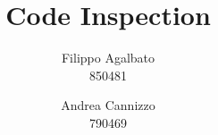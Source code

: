\documentclass[a4paper]{report}
\begin{document}
\setcounter{tocdepth}{1}

\title{\Huge Code Inspection}
\author{Filippo Agalbato \\ 850481 \and Andrea Cannizzo \\ 790469}
\maketitle

\tableofcontents



\appendix

\end{document}
